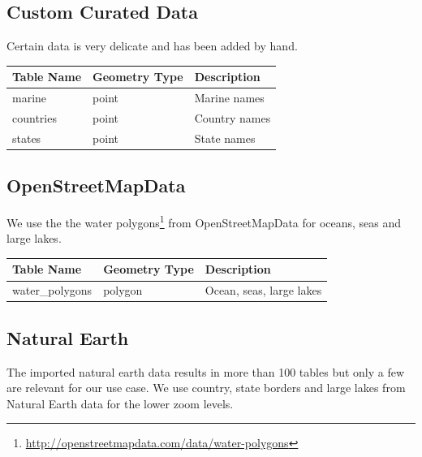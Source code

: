 \subsection{Custom Curated Data}

Certain data is very delicate and has been added by hand.

\begin{flushleft}
    \begin{tabular}{lll}
    \hline
    Table Name   & Geometry Type & Description \\
    \hline                                          
    marine       & point    & Marine names \\
    countries    & point    & Country names \\
    states       & point    & State names \\
    \end{tabular}
\end{flushleft}

\subsection{OpenStreetMapData}

We use the the water polygons\footnote{\url{http://openstreetmapdata.com/data/water-polygons}} 
from OpenStreetMapData for oceans, seas and large lakes.

\begin{flushleft}
    \begin{tabular}{lll}
    \hline
    Table Name            & Geometry Type & Description \\
    \hline
    water\_polygons        & polygon       & Ocean, seas, large lakes           \\
    \end{tabular}
\end{flushleft}


\subsection{Natural Earth}


The imported natural earth data results in more than 100 tables but only a few
are relevant for our use case.
We use country, state borders and large lakes from Natural Earth data for the lower zoom
levels.


